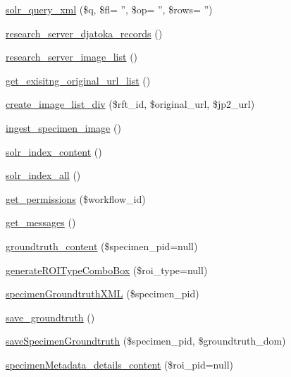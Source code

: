 \begin{DoxyCompactItemize}
\item 
\hyperlink{workspace_8functions_8php_ae6356bbdc7e39f2f56be2e74848e4c58}{solr\_\-query\_\-xml} (\$q, \$fl= '', \$op= '', \$rows= '')
\item 
\hyperlink{workspace_8functions_8php_a4400883073feeaa376e7a5d300ec6ba3}{research\_\-server\_\-djatoka\_\-records} ()
\item 
\hyperlink{workspace_8functions_8php_ad361b927889bc4fdfef4e2f01cf384dc}{research\_\-server\_\-image\_\-list} ()
\item 
\hyperlink{workspace_8functions_8php_afd4c34745073e420fe7eb937bce76c84}{get\_\-exisitng\_\-original\_\-url\_\-list} ()
\item 
\hyperlink{workspace_8functions_8php_a26e860b17a8534a5a2bb240d494b76c0}{create\_\-image\_\-list\_\-div} (\$rft\_\-id, \$original\_\-url, \$jp2\_\-url)
\item 
\hyperlink{workspace_8functions_8php_ad6f3771cf2c736aca9e2f2eb7a9faeb5}{ingest\_\-specimen\_\-image} ()
\item 
\hyperlink{workspace_8functions_8php_aa907bebbf9d9ff75c35b10ee24d48014}{solr\_\-index\_\-content} ()
\item 
\hyperlink{workspace_8functions_8php_ae9693dc9f84cbbc0af0a55c846368601}{solr\_\-index\_\-all} ()
\item 
\hyperlink{workspace_8functions_8php_af809f04afe95b229e0dc950ce3b6769d}{get\_\-permissions} (\$workflow\_\-id)
\item 
\hyperlink{workspace_8functions_8php_a280fc131731bf4215c07840696bf8800}{get\_\-messages} ()
\item 
\hyperlink{workspace_8functions_8php_a3fcbb2d7c87717858ed2c67810edb332}{groundtruth\_\-content} (\$specimen\_\-pid=null)
\item 
\hyperlink{workspace_8functions_8php_ab9a8172f63d537dbc410950d9d4bb6c7}{generateROITypeComboBox} (\$roi\_\-type=null)
\item 
\hyperlink{workspace_8functions_8php_a825237a28262df1a190ada50bee6cdc3}{specimenGroundtruthXML} (\$specimen\_\-pid)
\item 
\hyperlink{workspace_8functions_8php_aeee9947eee2bb5bdfd11770c7e396f0f}{save\_\-groundtruth} ()
\item 
\hyperlink{workspace_8functions_8php_a45640349162da1bfbf1814e8fbef3c31}{saveSpecimenGroundtruth} (\$specimen\_\-pid, \$groundtruth\_\-dom)
\item 
\hyperlink{workspace_8functions_8php_a514e188b2f9918409ed91f774a9f8299}{specimenMetadata\_\-details\_\-content} (\$roi\_\-pid=null)
\end{DoxyCompactItemize}
